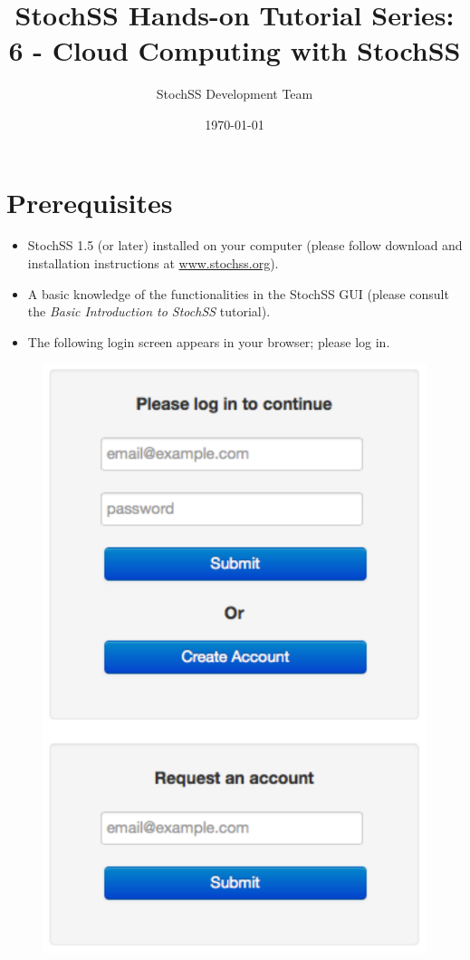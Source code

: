 \documentclass[12pt,notitlepage,nofootinbib]{revtex4}
\begin{document}
\title{StochSS Hands-on Tutorial Series: 6 - Cloud Computing with StochSS}

\author{StochSS Development Team}

\date{\today}

\maketitle

\section{\label{sec:pre}Prerequisites}
\begin{itemize}
\item StochSS 1.5 (or later) installed on your computer (please follow download and installation instructions at \url{www.stochss.org}). 
\item A basic knowledge of the functionalities in the StochSS GUI (please consult the \textit{Basic Introduction to StochSS} tutorial).
\item The following login screen appears in your browser; please log in.
\end{itemize}


\begin{figure}[!ht]
\centering
\includegraphics[scale=0.55]{user-login.pdf}
\end{figure}
\end{document}
